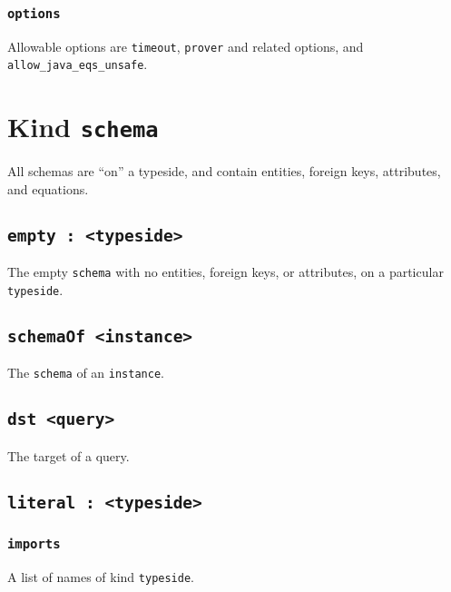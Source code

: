 \documentclass[10pt]{book}
\begin{document}
\subsection{{\tt options}}
Allowable options are {\tt timeout}, {\tt prover} and related options, and {\tt allow\_java\_eqs\_unsafe}.

\chapter{Kind {\tt schema}}

All schemas are ``on'' a typeside, and contain entities, foreign keys, attributes, and equations.

\section{{\tt empty : <typeside>}}
The empty {\tt schema} with no entities, foreign keys, or attributes, on a particular {\tt typeside}.

\section{{\tt schemaOf <instance>}}
The {\tt schema} of an {\tt instance}.

%
%
%
\section{{\tt dst <query>}}
The target of a query.

\section{{\tt literal : <typeside>}}
\subsection{{\tt imports}}
A list of names of kind {\tt typeside}.
\end{document}
